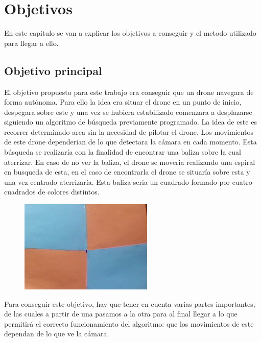 \chapter{Objetivos}\label{cap.Objetivos}
En este capitulo se van a explicar los objetivos a conseguir y el metodo utilizado para llegar a ello.

\section{Objetivo principal}
\hspace{1 cm} El objetivo propuesto para este trabajo era conseguir que un drone navegara de forma aut\'onoma. Para ello la idea era situar el drone en un punto de inicio, despegara sobre este y una vez se hubiera estabilizado comenzara a desplazarse siguiendo un algoritmo de b\'usqueda previamente programado. La idea de este es recorrer determinado area sin la necesidad de pilotar el drone. Los movimientos de este drone dependerian de lo que detectara la c\'amara en cada momento. Esta b\'usqueda se realizar\'ia con la finalidad de encontrar una baliza sobre la cual aterrizar. En caso de no ver la baliza, el drone se moveria realizando una espiral en busqueda de esta, en el caso de encontrarla el drone se situar\'ia sobre esta y una vez centrado aterrizar\'ia. Esta baliza seria un cuadrado formado por cuatro cuadrados de colores distintos. 

\begin{figure}[H]
	\centering
		\includegraphics{imgs/baliza.jpg}
	\label{fig:Baliza elegida sobre la que aterrizar. }
\end{figure}

\hspace{1 cm} Para conseguir este objetivo, hay que tener en cuenta varias partes importantes, de las cuales a partir de una pasamos a la otra para al final llegar a lo que permitir\'a el correcto funcionamiento del algoritmo: que los movimientos de este dependan de lo que ve la c\'amara.

